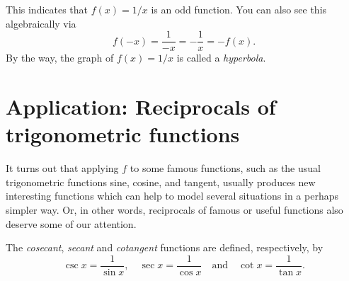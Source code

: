 \documentclass{ximera}
\begin{document}
\begin{image}
\end{image}

This indicates that $f(x) = 1/x$ is an odd function. You can also see this algebraically via $$  f(-x) = \frac{1}{-x} = -\frac{1}{x} = -f(x).  $$
By the way, the graph of $f(x) = 1/x$ is called a \emph{hyperbola}.

\section{Application: Reciprocals of trigonometric functions}

It turns out that applying $f$ to some famous functions, such as the usual trigonometric functions sine, cosine, and tangent, usually produces new interesting functions which can help to model several situations in a perhaps simpler way. Or, in other words, reciprocals of famous or useful functions also deserve some of our attention.

\begin{definition}
  The \emph{cosecant}, \emph{secant} and \emph{cotangent} functions are defined, respectively, by $$   \csc x = \frac{1}{\sin x}, \quad \sec x = \frac{1}{\cos x} \quad\mbox{and}\quad \cot x = \frac{1}{\tan x}.  $$
\end{definition}
\end{document}
